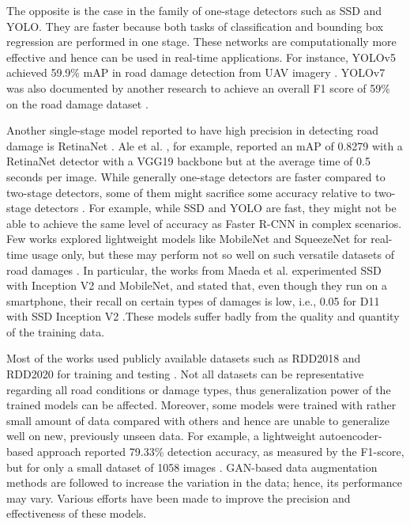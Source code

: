 The opposite is the case in the family of one-stage detectors such as SSD and YOLO. They are faster because both tasks of classification and bounding box regression are performed in one stage. These networks are computationally more effective and hence can be used in real-time applications. For instance, YOLOv5 achieved 59.9\% mAP in road damage detection from UAV imagery \cite{Silva2023}. YOLOv7 was also documented by another research to achieve an overall F1 score of 59\% on the road damage dataset \cite{Silva2023}.

Another single-stage model reported to have high precision in detecting road damage is RetinaNet \cite{7}. Ale et al. , for example, reported an mAP of 0.8279 with a RetinaNet detector with a VGG19 backbone but at the average time of 0.5 seconds per image. While generally one-stage detectors are faster compared to two-stage detectors, some of them might sacrifice some accuracy relative to two-stage detectors \cite{7}. For example, while SSD and YOLO are fast, they might not be able to achieve the same level of accuracy as Faster R-CNN in complex scenarios. Few works explored lightweight models like MobileNet and SqueezeNet for real-time usage only, but these may perform not so well on such versatile datasets of road damages \cite{Ha2022}. In particular, the works from Maeda et al. experimented SSD with Inception V2 and MobileNet, and stated that, even though they run on a smartphone, their recall on certain types of damages is low, i.e., 0.05 for D11 with SSD Inception V2 \cite{Maeda2018}.These models suffer badly from the quality and quantity of the training data.

Most of the works used publicly available datasets such as RDD2018 and RDD2020 for training and testing \cite{ Ale2018,Arya2021}. Not all datasets can be representative regarding all road conditions or damage types, thus generalization power of the trained models can be affected. Moreover, some models were trained with rather small amount of data compared with others and hence are unable to generalize well on new, previously unseen data. For example, a lightweight autoencoder-based approach reported 79.33\% detection accuracy, as measured by the F1-score, but for only a small dataset of 1058 images \cite{ Samma2021}. GAN-based data augmentation methods are followed to increase the variation in the data; hence, its performance may vary. Various efforts have been made to improve the precision and effectiveness of these models.

